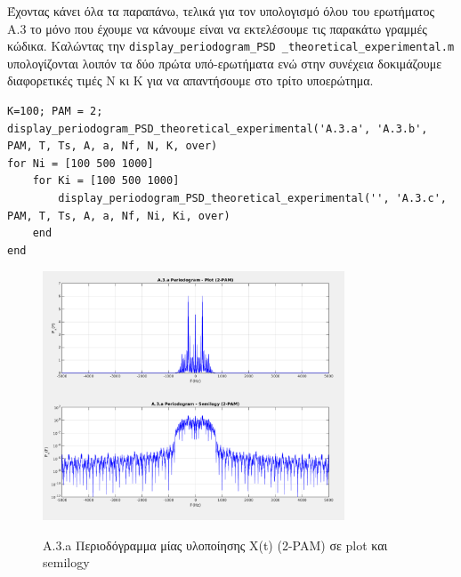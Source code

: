 \documentclass[11pt]{article}
\begin{document}
    \par \noindent
    Έχοντας κάνει όλα τα παραπάνω, τελικά για τον υπολογισμό όλου του ερωτήματος Α.3 το μόνο που έχουμε να κάνουμε είναι να εκτελέσουμε τις παρακάτω γραμμές κώδικα.
    Καλώντας την \texttt{display\_periodogram\_PSD \_theoretical\_experimental.m} υπολογίζονται λοιπόν τα δύο πρώτα υπό-ερωτήματα ενώ στην συνέχεια δοκιμάζουμε διαφορετικές τιμές Ν κι Κ για να απαντήσουμε στο τρίτο υποερώτημα.
    
    \begin{lstlisting}[caption = {A.3 Periodogram - theoretical and practical PSD}]
K=100; PAM = 2;
display_periodogram_PSD_theoretical_experimental('A.3.a', 'A.3.b', PAM, T, Ts, A, a, Nf, N, K, over)
for Ni = [100 500 1000] 
    for Ki = [100 500 1000]
        display_periodogram_PSD_theoretical_experimental('', 'A.3.c', PAM, T, Ts, A, a, Nf, Ni, Ki, over)
    end
end
    \end{lstlisting}
    
      \begin{figure}[H]
        \centering
        \includegraphics[scale=0.5, width=0.8\textwidth]{photos/A.3.a Periodogram - 2PAM_plot-semilogy.png} \\
        \caption{A.3.a Περιοδόγραμμα μίας υλοποίησης X(t) (2-PAM) σε plot και semilogy}
    \end{figure}
    
\end{document}
